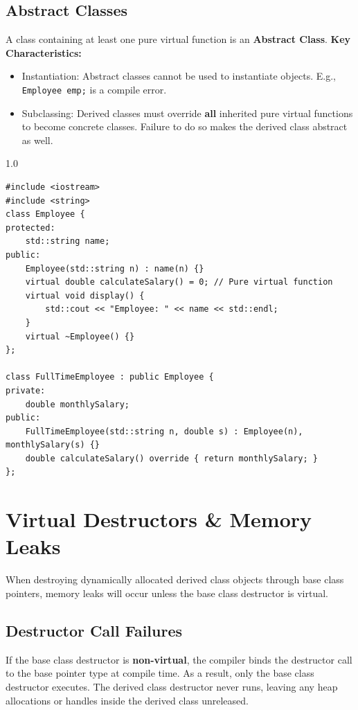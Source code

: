 \documentclass[12pt,a4paper]{article}
\begin{document}
\subsection{Abstract Classes}
A class containing at least one pure virtual function is an \textbf{Abstract Class}.
\textbf{Key Characteristics:}
\begin{itemize}[leftmargin=*, itemsep=2.5pt]
  \item Instantiation: Abstract classes cannot be used to instantiate objects. E.g., \texttt{Employee emp;} is a compile error.
  \item Subclassing: Derived classes must override \textbf{all} inherited pure virtual functions to become concrete classes. Failure to do so makes the derived class abstract as well.
\end{itemize}

\begin{tcolorbox}[examplebox, title={Code Example: Abstract Employee base class}]
\begin{spacing}{1.0}
\begin{verbatim}
#include <iostream>
#include <string>
class Employee {
protected:
    std::string name;
public:
    Employee(std::string n) : name(n) {}
    virtual double calculateSalary() = 0; // Pure virtual function
    virtual void display() {
        std::cout << "Employee: " << name << std::endl;
    }
    virtual ~Employee() {}
};

class FullTimeEmployee : public Employee {
private:
    double monthlySalary;
public:
    FullTimeEmployee(std::string n, double s) : Employee(n), monthlySalary(s) {}
    double calculateSalary() override { return monthlySalary; }
};
\end{verbatim}
\end{spacing}
\end{tcolorbox}

\section{Virtual Destructors \& Memory Leaks}

When destroying dynamically allocated derived class objects through base class pointers, memory leaks will occur unless the base class destructor is virtual.

\subsection{Destructor Call Failures}
If the base class destructor is \textbf{non-virtual}, the compiler binds the destructor call to the base pointer type at compile time.
As a result, only the base class destructor executes. The derived class destructor never runs, leaving any heap allocations or handles inside the derived class unreleased.
\end{document}
